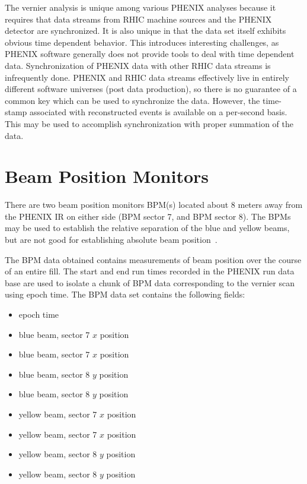 The vernier analysis is unique among various PHENIX analyses because it requires
that data streams from RHIC machine sources and the PHENIX detector are
synchronized. It is also unique in that the data set itself exhibits obvious
time dependent behavior. This introduces interesting challenges, as PHENIX
software generally does not provide tools to deal with time dependent data.
Synchronization of PHENIX data with other RHIC data streams is infrequently
done. PHENIX and RHIC data streams effectively live in entirely different
software universes (post data production), so there is no guarantee of a common
key which can be used to synchronize the data. However, the time-stamp
associated with reconstructed events is available on a per-second basis. This
may be used to accomplish synchronization with proper summation of the data.

\clearpage
\section{Beam Position Monitors}
\label{sec:beam_position_monitoring}
There are two beam position monitors BPM(s) located about 8 meters away from the
PHENIX IR on either side (BPM sector 7, and BPM sector 8). The BPMs may be used
to establish the relative separation of the blue and yellow beams, but are not
good for establishing absolute beam position~\cite{Drees2013}.  

The BPM data obtained contains measurements of beam position over the course of
an entire fill. The start and end run times recorded in the PHENIX run data
base are used to isolate a chunk of BPM data corresponding to the vernier scan
using epoch time. The BPM data set contains the following fields:
\begin{itemize}
\item epoch time
\item blue beam, sector 7 $x$ position
\item blue beam, sector 7 $x$ position
\item blue beam, sector 8 $y$ position
\item blue beam, sector 8 $y$ position
\item yellow beam, sector 7 $x$ position
\item yellow beam, sector 7 $x$ position
\item yellow beam, sector 8 $y$ position
\item yellow beam, sector 8 $y$ position
\end{itemize}

